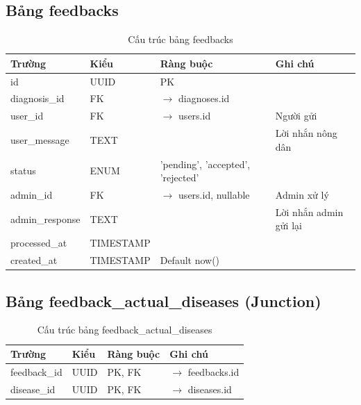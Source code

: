 \documentclass[12pt,a4paper]{article}
\begin{document}
\subsection{Bảng feedbacks}
\begin{longtable}{|l|l|l|p{6.5cm}|}
    \caption{Cấu trúc bảng feedbacks}                                                            \\
    \hline
    \rowcolor{headerblue}
    \textbf{Trường} & \textbf{Kiểu} & \textbf{Ràng buộc}                & \textbf{Ghi chú}       \\
    \hline
    id              & UUID          & PK                                &                        \\
    \hline
    diagnosis\_id   & FK            & $\rightarrow$ diagnoses.id        &                        \\
    \hline
    user\_id        & FK            & $\rightarrow$ users.id            & Người gửi              \\
    \hline
    user\_message   & TEXT          &                                   & Lời nhắn nông dân      \\
    \hline
    status          & ENUM          & 'pending', 'accepted', 'rejected' &                        \\
    \hline
    admin\_id       & FK            & $\rightarrow$ users.id, nullable  & Admin xử lý            \\
    \hline
    admin\_response & TEXT          &                                   & Lời nhắn admin gửi lại \\
    \hline
    processed\_at   & TIMESTAMP     &                                   &                        \\
    \hline
    created\_at     & TIMESTAMP     & Default now()                     &                        \\
    \hline
\end{longtable}

\subsection{Bảng feedback\_actual\_diseases (Junction)}
\begin{longtable}{|l|l|l|l|}
    \caption{Cấu trúc bảng feedback\_actual\_diseases}                                \\
    \hline
    \rowcolor{headerblue}
    \textbf{Trường} & \textbf{Kiểu} & \textbf{Ràng buộc} & \textbf{Ghi chú}           \\
    \hline
    feedback\_id    & UUID          & PK, FK             & $\rightarrow$ feedbacks.id \\
    \hline
    disease\_id     & UUID          & PK, FK             & $\rightarrow$ diseases.id  \\
    \hline
\end{longtable}
\end{document}
